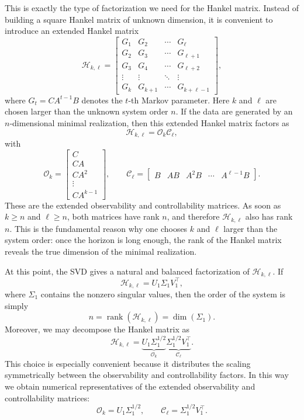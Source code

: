 This is exactly the type of factorization we need for the Hankel matrix. Instead of building a square Hankel matrix of unknown dimension, it is convenient to introduce an extended Hankel matrix
\[
\mathcal{H}_{k,\ell}=
\begin{bmatrix}
G_1 & G_2 & \cdots & G_\ell\\
G_2 & G_3 & \cdots & G_{\ell+1}\\
G_3 & G_4 & \cdots & G_{\ell+2}\\
\vdots & \vdots & \ddots & \vdots\\
G_k & G_{k+1} & \cdots & G_{k+\ell-1}
\end{bmatrix},
\]
where \(G_t = CA^{t-1}B\) denotes the \(t\)-th Markov parameter. Here \(k\) and \(\ell\) are chosen larger than the unknown system order \(n\). If the data are generated by an \(n\)-dimensional minimal realization, then this extended Hankel matrix factors as
\[
\mathcal{H}_{k,\ell}=\mathcal{O}_k\mathcal{C}_\ell,
\]
with
\[
\mathcal{O}_k=
\begin{bmatrix}
C\\
CA\\
CA^2\\
\vdots\\
CA^{k-1}
\end{bmatrix},
\qquad
\mathcal{C}_\ell=
\begin{bmatrix}
B & AB & A^2B & \cdots & A^{\ell-1}B
\end{bmatrix}.
\]
These are the extended observability and controllability matrices. As soon as \(k\ge n\) and \(\ell\ge n\), both matrices have rank \(n\), and therefore \(\mathcal{H}_{k,\ell}\) also has rank \(n\). This is the fundamental reason why one chooses \(k\) and \(\ell\) larger than the system order: once the horizon is long enough, the rank of the Hankel matrix reveals the true dimension of the minimal realization.

At this point, the SVD gives a natural and balanced factorization of \(\mathcal{H}_{k,\ell}\). If
\[
\mathcal{H}_{k,\ell}=U_1\Sigma_1V_1^\top,
\]
where \(\Sigma_1\) contains the nonzero singular values, then the order of the system is simply
\[
n=\operatorname{rank}(\mathcal{H}_{k,\ell})=\dim(\Sigma_1).
\]
Moreover, we may decompose the Hankel matrix as
\[
\mathcal{H}_{k,\ell}
=
\underbrace{U_1\Sigma_1^{1/2}}_{\mathcal{O}_k}
\underbrace{\Sigma_1^{1/2}V_1^\top}_{\mathcal{C}_\ell}.
\]
This choice is especially convenient because it distributes the scaling symmetrically between the observability and controllability factors. In this way we obtain numerical representatives of the extended observability and controllability matrices:
\[
\mathcal{O}_k = U_1\Sigma_1^{1/2},
\qquad
\mathcal{C}_\ell = \Sigma_1^{1/2}V_1^\top.
\]

